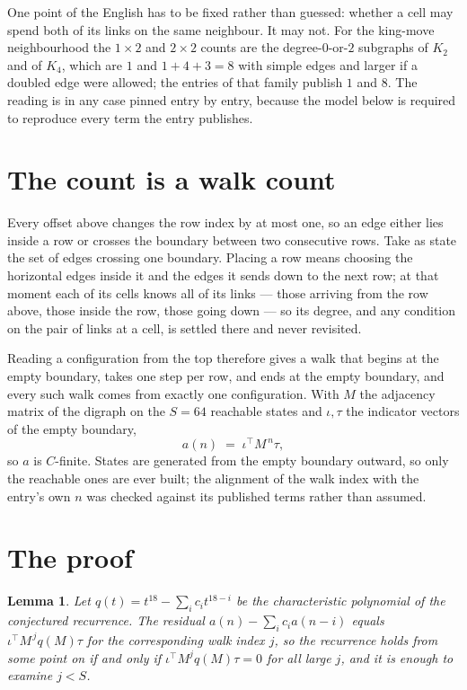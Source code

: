 \documentclass[11pt,a4paper]{article}
\theoremstyle{plain}
\newtheorem{lemma}[theorem]{Lemma}
\theoremstyle{definition}
\begin{document}
One point of the English has to be fixed rather than guessed: whether a cell may spend both of
its links on the same neighbour. It may not. For the king-move neighbourhood the $1\times2$
and $2\times2$ counts are the degree-$0$-or-$2$ subgraphs of $K_2$ and of $K_4$, which are $1$
and $1+4+3=8$ with simple edges and larger if a doubled edge were allowed; the entries of that
family publish $1$ and $8$. The reading is in any case pinned entry by entry, because the
model below is required to reproduce every term the entry publishes.


\section{The count is a walk count}

Every offset above changes the row index by at most one, so an edge either lies inside a row
or crosses the boundary between two consecutive rows. Take as state the set of edges crossing
one boundary. Placing a row means choosing the horizontal edges inside it and the edges it
sends down to the next row; at that moment each of its cells knows all of its links --- those
arriving from the row above, those inside the row, those going down --- so its degree, and any
condition on the pair of links at a cell, is settled there and never revisited.

Reading a configuration from the top therefore gives a walk that begins at the empty boundary,
takes one step per row, and ends at the empty boundary, and every such walk comes from exactly
one configuration. With $M$ the adjacency matrix of the digraph on the $S=64$ reachable
states and $\iota,\tau$ the indicator vectors of the empty boundary,
\[
a(n)\;=\;\iota^{\!\top}M^{\,n}\tau ,
\]
so $a$ is $C$-finite. States are generated from the empty boundary outward, so only the
reachable ones are ever built; the alignment of the walk index with the entry's own $n$ was
checked against its published terms rather than assumed.

\section{The proof}

\begin{lemma}\label{lem:crit}
Let $q(t)=t^{18}-\sum_i c_it^{18-i}$ be the characteristic polynomial of the
conjectured recurrence. The residual $a(n)-\sum_ic_ia(n-i)$ equals
$\iota^{\!\top}M^{\,j}q(M)\tau$ for the corresponding walk index $j$, so the recurrence
holds from some point on if and only if $\iota^{\!\top}M^{j}q(M)\tau=0$ for all large $j$,
and it is enough to examine $j<S$.
\end{lemma}
\end{document}
